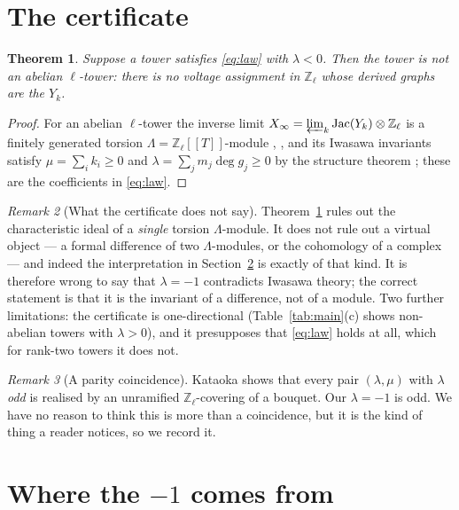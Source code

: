 \documentclass[11pt]{article}
\theoremstyle{plain}
\newtheorem{theorem}{Theorem}
\theoremstyle{remark}
\newtheorem{remark}[theorem]{Remark}
\newcommand{\Z}{\mathbb{Z}}
\newcommand{\Zl}{\Z_\ell}
\newcommand{\Jac}{\operatorname{Jac}}
\newcommand{\La}{\Lambda}
\begin{document}
\section{The certificate}\label{sec:cert}

\begin{theorem}\label{thm:cert}
Suppose a tower satisfies \eqref{eq:law} with $\lambda<0$. Then the tower is not an
abelian $\ell$-tower: there is no voltage assignment in $\Zl$ whose derived graphs are the
$Y_k$.
\end{theorem}

\begin{proof}
For an abelian $\ell$-tower the inverse limit
$X_\infty=\varprojlim_k\Jac(Y_k)\otimes\Zl$ is a finitely generated torsion
$\La=\Zl[[T]]$-module \cite[IV]{ANCFT}, \cite{Gonet22,MV24}, and its Iwasawa invariants
satisfy $\mu=\sum_ik_i\ge0$ and $\lambda=\sum_jm_j\deg g_j\ge0$ by the structure theorem
\cite[Thm.~13.12]{Washington}; these are the coefficients in \eqref{eq:law}.
\end{proof}

\begin{remark}[What the certificate does not say]\label{rem:caveat}
Theorem~\ref{thm:cert} rules out the characteristic ideal of a \emph{single} torsion
$\La$-module. It does not rule out a virtual object --- a formal difference of two
$\La$-modules, or the cohomology of a complex --- and indeed the interpretation in
Section~\ref{sec:where} is exactly of that kind. It is therefore wrong to say that
$\lambda=-1$ contradicts Iwasawa theory; the correct statement is that it is the invariant
of a difference, not of a module. Two further limitations: the certificate is
one-directional (Table~\ref{tab:main}(c) shows non-abelian towers with $\lambda>0$), and it
presupposes that \eqref{eq:law} holds at all, which for rank-two towers it does not.
\end{remark}

\begin{remark}[A parity coincidence]\label{rem:parity}
Kataoka \cite{Kataoka26} shows that every pair $(\lambda,\mu)$ with $\lambda$ \emph{odd} is
realised by an unramified $\Zl$-covering of a bouquet. Our $\lambda=-1$ is odd. We have no
reason to think this is more than a coincidence, but it is the kind of thing a reader
notices, so we record it.
\end{remark}

\section{Where the $-1$ comes from}\label{sec:where}
\end{document}
